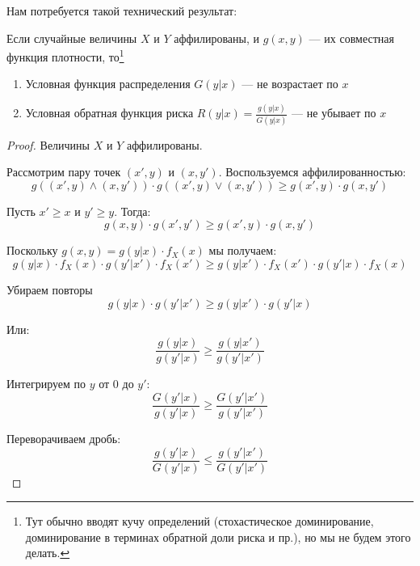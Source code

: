 Нам потребуется такой технический результат:
\begin{myth}
Если случайные величины $ X $ и $ Y $ аффилированы, и $ g(x,y) $ — их совместная функция плотности, то\footnote{Тут обычно вводят кучу определений (стохастическое доминирование, доминирование в терминах обратной доли риска и пр.), но мы не будем этого делать.}
\begin{enumerate}
\item Условная функция распределения $ G(y|x)$ — не возрастает по $ x $
\item Условная обратная функция риска  $ R(y|x)=\frac{g(y|x)}{G(y|x)} $ — не убывает по $ x $
\end{enumerate}
\end{myth}
\begin{proof}
Величины $ X $ и $ Y $ аффилированы.

Рассмотрим пару точек $ (x',y) $ и $ (x,y') $. Воспользуемся аффилированностью:
\begin{equation}
g((x',y)\wedge (x,y'))\cdot g((x',y)\vee (x,y'))\geq g(x',y)\cdot g(x,y')
\end{equation}


Пусть $ x'\geq x $ и $ y'\geq y $. Тогда:
\begin{equation}
g(x,y)\cdot g(x',y')\geq g(x',y)\cdot g(x,y')
\end{equation}

Поскольку $ g(x,y)=g(y|x)\cdot f_{X}(x) $ мы получаем:
\begin{equation}
g(y|x)\cdot f_{X}(x)\cdot g(y'|x')\cdot f_{X}(x')\geq g(y|x')\cdot f_{X}(x')\cdot g(y'|x)\cdot f_{X}(x)
\end{equation}

Убираем повторы
\begin{equation}
g(y|x)\cdot g(y'|x')\geq g(y|x')\cdot g(y'|x)
\end{equation}

Или:
\begin{equation}
\frac{g(y|x)}{g(y'|x)}\geq \frac{g(y|x')}{g(y'|x')}
\end{equation}

Интегрируем по $ y $ от $ 0 $ до $ y' $:
\begin{equation}
\frac{G(y'|x)}{g(y'|x)}\geq \frac{G(y'|x')}{g(y'|x')}
\end{equation}

Переворачиваем дробь:
\begin{equation}
\frac{g(y'|x)}{G(y'|x)}\leq \frac{g(y'|x')}{G(y'|x')}
\end{equation}


\end{proof}
